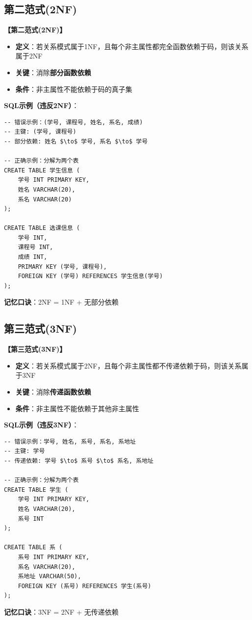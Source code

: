 \documentclass[12pt, a4paper]{article}
\newenvironment{bluebox}[1]{%
  \begin{trivlist}
  \item[\hskip\labelsep \textbf{#1}]
  \setlength{\parskip}{0.5ex}
  \setlength{\itemsep}{0.5ex}
}{%
  \end{trivlist}
  }
\begin{document}
\subsection{第二范式(2NF)}

\begin{bluebox}{2NF定义}
	\textbf{【第二范式(2NF)】}

	\begin{itemize}[leftmargin=*, nosep]
		\item \textbf{定义}：若关系模式属于1NF，且每个非主属性都完全函数依赖于码，则该关系属于2NF
		\item \textbf{关键}：消除\textbf{部分函数依赖}
		\item \textbf{条件}：非主属性不能依赖于码的真子集
	\end{itemize}

	\textbf{SQL示例（违反2NF）}：
	\begin{verbatim}
-- 错误示例：(学号, 课程号, 姓名, 系名, 成绩)
-- 主键: (学号, 课程号)
-- 部分依赖: 姓名 $\to$ 学号, 系名 $\to$ 学号

-- 正确示例：分解为两个表
CREATE TABLE 学生信息 (
    学号 INT PRIMARY KEY,
    姓名 VARCHAR(20),
    系名 VARCHAR(20)
);

CREATE TABLE 选课信息 (
    学号 INT,
    课程号 INT,
    成绩 INT,
    PRIMARY KEY (学号, 课程号),
    FOREIGN KEY (学号) REFERENCES 学生信息(学号)
);
	\end{verbatim}

	\textbf{记忆口诀}：2NF = 1NF + 无部分依赖
\end{bluebox}

\subsection{第三范式(3NF)}

\begin{bluebox}{3NF定义}
	\textbf{【第三范式(3NF)】}

	\begin{itemize}[leftmargin=*, nosep]
		\item \textbf{定义}：若关系模式属于2NF，且每个非主属性都不传递依赖于码，则该关系属于3NF
		\item \textbf{关键}：消除\textbf{传递函数依赖}
		\item \textbf{条件}：非主属性不能依赖于其他非主属性
	\end{itemize}

	\textbf{SQL示例（违反3NF）}：
	\begin{verbatim}
-- 错误示例：学号, 姓名, 系号, 系名, 系地址
-- 主键: 学号
-- 传递依赖: 学号 $\to$ 系号 $\to$ 系名, 系地址

-- 正确示例：分解为两个表
CREATE TABLE 学生 (
    学号 INT PRIMARY KEY,
    姓名 VARCHAR(20),
    系号 INT
);

CREATE TABLE 系 (
    系号 INT PRIMARY KEY,
    系名 VARCHAR(20),
    系地址 VARCHAR(50),
    FOREIGN KEY (系号) REFERENCES 学生(系号)
);
	\end{verbatim}

	\textbf{记忆口诀}：3NF = 2NF + 无传递依赖
\end{bluebox}
\end{document}
